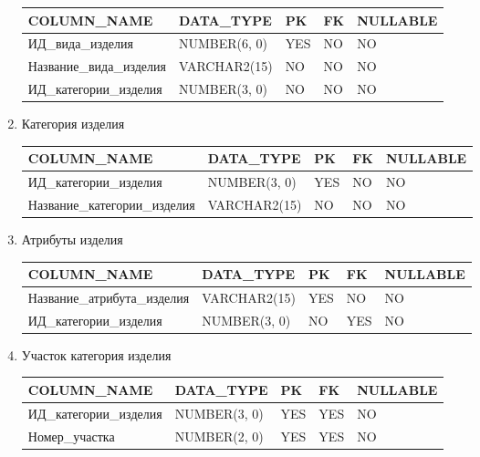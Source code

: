 \begin{enumerate}
    \begin{tabular}{|p{4cm}|p{3cm}|p{1cm}|p{1cm}|p{2cm}|} \hline

        {\bf COLUMN\_NAME} & {\bf DATA\_TYPE} & {\bf PK} & {\bf FK} & {\bf NULLABLE} \\ \hline
        ИД\_вида\_изделия & NUMBER(6, 0) & YES & NO & NO \\ \hline
        Название\_вида\_изделия & VARCHAR2(15) & NO & NO & NO \\ \hline
        ИД\_категории\_изделия & NUMBER(3, 0) & NO & NO & NO \\ \hline

    \end{tabular}

    \item{Категория изделия}

    \begin{tabular}{|p{4cm}|p{3cm}|p{1cm}|p{1cm}|p{2cm}|} \hline

        {\bf COLUMN\_NAME} & {\bf DATA\_TYPE} & {\bf PK} & {\bf FK} & {\bf NULLABLE} \\ \hline
        ИД\_категории\_изделия & NUMBER(3, 0) & YES & NO & NO \\ \hline
        Название\_категории\_изделия & VARCHAR2(15) & NO & NO & NO \\ \hline

    \end{tabular}

    \item{Атрибуты изделия}

    \begin{tabular}{|p{4cm}|p{3cm}|p{1cm}|p{1cm}|p{2cm}|} \hline

        {\bf COLUMN\_NAME} & {\bf DATA\_TYPE} & {\bf PK} & {\bf FK} & {\bf NULLABLE} \\ \hline
        Название\_атрибута\_изделия & VARCHAR2(15) & YES & NO & NO \\ \hline
        ИД\_категории\_изделия & NUMBER(3, 0) & NO & YES & NO \\ \hline

    \end{tabular}

    \item Участок категория изделия

    \begin{tabular}{|p{4cm}|p{3cm}|p{1cm}|p{1cm}|p{2cm}|} \hline

        {\bf COLUMN\_NAME} & {\bf DATA\_TYPE} & {\bf PK} & {\bf FK} & {\bf NULLABLE} \\ \hline
        ИД\_категории\_изделия & NUMBER(3, 0) & YES & YES & NO \\ \hline
        Номер\_участка & NUMBER(2, 0) & YES & YES & NO \\ \hline

    \end{tabular}

\end{enumerate}

